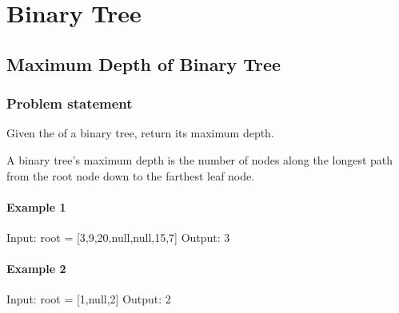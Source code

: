 \documentclass[letterpaper,12pt,english]{book}
\begin{document}
\sphinxstepscope


\chapter{Binary Tree}
\label{\detokenize{Binary_Tree/index:binary-tree}}\label{\detokenize{Binary_Tree/index::doc}}
\sphinxstepscope


\section{Maximum Depth of Binary Tree}
\label{\detokenize{Binary_Tree/104_Maximum_Depth_of_Binary_Tree:maximum-depth-of-binary-tree}}\label{\detokenize{Binary_Tree/104_Maximum_Depth_of_Binary_Tree::doc}}

\subsection{Problem statement\sphinxfootnotemark[66]}
\label{\detokenize{Binary_Tree/104_Maximum_Depth_of_Binary_Tree:problem-statement}}%
\begin{footnotetext}[66]\sphinxAtStartFootnote
{}
%
\end{footnotetext}\ignorespaces 
\sphinxAtStartPar
Given the  of a binary tree, return its maximum depth.

\sphinxAtStartPar
A binary tree’s maximum depth is the number of nodes along the longest path from the root node down to the farthest leaf node.


\subsubsection{Example 1}
\label{\detokenize{Binary_Tree/104_Maximum_Depth_of_Binary_Tree:example-1}}
\sphinxAtStartPar
{}

\begin{sphinxVerbatim}[commandchars=\\\{\}]
Input: root = [3,9,20,null,null,15,7]
Output: 3
\end{sphinxVerbatim}


\subsubsection{Example 2}
\label{\detokenize{Binary_Tree/104_Maximum_Depth_of_Binary_Tree:example-2}}
\begin{sphinxVerbatim}[commandchars=\\\{\}]
Input: root = [1,null,2]
Output: 2
\end{sphinxVerbatim}
\end{document}
